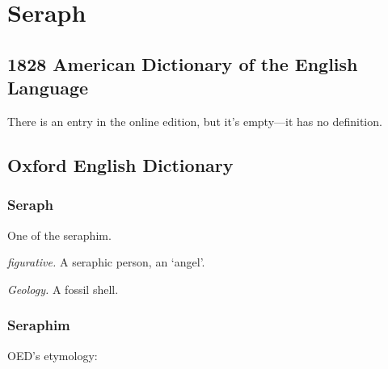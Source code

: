 \section{Seraph}
	\label{SERAPH}
	

\subsection{1828 American Dictionary of the English Language} %
	\label{SERAPH-1828}
	
	There is an entry in the online edition, but it's empty---it has no definition.


\subsection{Oxford English Dictionary} %
	\label{SERAPH-OED}
	
	\subsubsection{Seraph}

		\begin{compactitem}
			\item[1.a] One of the seraphim.
			\item[1.b] \textit{figurative.} A seraphic person, an `angel'.
			\item[2] \textit{Geology.} A fossil shell.
		\end{compactitem}
		
	\subsubsection{Seraphim}
	
		OED's etymology:
		

